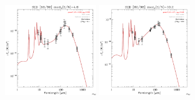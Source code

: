 \documentclass[preprint2,longabstract]{aastex}
\begin{document}
\begin{figure}
    \includegraphics[trim=0 2mm 0 0, clip, width=40mm]{SEDs/sed_59.pdf}
	\includegraphics[trim=0 2mm 0 0, clip, width=40mm]{SEDs/sed_60.pdf}
\end{figure}
\end{document}
